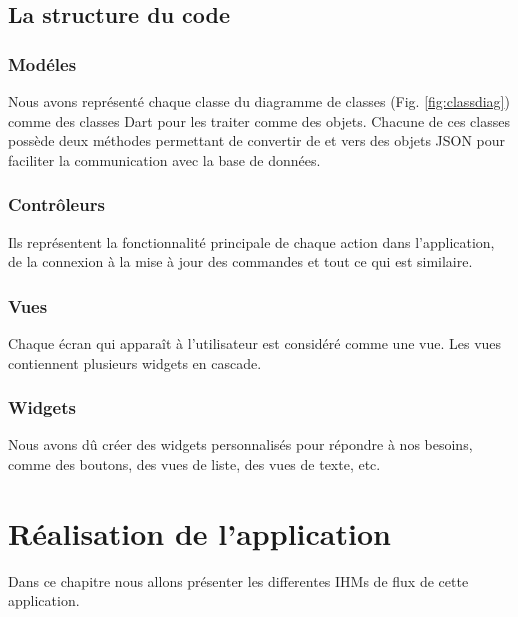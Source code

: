 \documentclass[french, a4paper, 12pt]{report}
\begin{document}
	
	\newpage		
	\section{La structure du code}
		\subsection{Modéles} Nous avons représenté chaque classe du diagramme de classes (Fig. \ref{fig:classdiag}) comme des classes Dart pour les traiter comme des objets. Chacune de ces classes possède deux méthodes permettant de convertir de et vers des objets JSON  pour faciliter la communication avec la base de données.
		\subsection{Contrôleurs} Ils représentent la fonctionnalité principale de chaque action dans l'application, de la connexion à la mise à jour des commandes et tout ce qui est similaire.
		\subsection{Vues} Chaque écran qui apparaît à l'utilisateur est considéré comme une vue. Les vues contiennent plusieurs widgets en cascade.
		\subsection{Widgets} Nous avons dû créer des widgets personnalisés pour répondre à nos besoins, comme des boutons, des vues de liste, des vues de texte, etc.
		
\newpage
\chapter{Réalisation de l'application} Dans ce chapitre nous allons présenter les differentes IHMs de flux de cette application.
\end{document}
